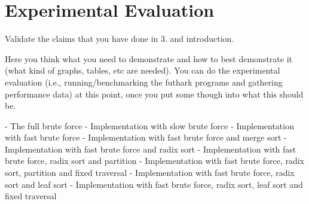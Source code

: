 \section{Experimental Evaluation}
\label{sec:eval}
Validate the claims that you have done in 3. and introduction.

Here you think what you need to demonstrate and how to best demonstrate it
(what kind of graphs, tables, etc are needed). You can do the experimental evaluation
(i.e., running/benchmarking the futhark programs and gathering performance data)
at this point, once you put some though into what this should be.


- The full brute force
- Implementation with slow brute force
- Implementation with fast brute force
- Implementation with fast brute force and merge sort
- Implementation with fast brute force and radix sort
- Implementation with fast brute force, radix sort and partition
- Implementation with fast brute force, radix sort, partition and fixed traversal
- Implementation with fast brute force, radix sort and leaf sort
- Implementation with fast brute force, radix sort, leaf sort and fixed traversal





